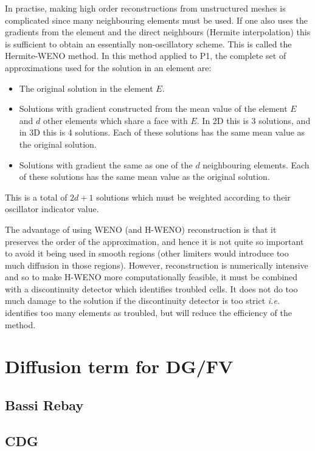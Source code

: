 In practise, making high order reconstructions from unstructured
meshes is complicated since many neighbouring elements must be
used. If one also uses the gradients from the element and the direct
neighbours (Hermite interpolation) this is sufficient to obtain an
essentially non-oscillatory scheme. This is called the Hermite-WENO
method. In this method applied to P1, the complete set of
approximations used for the solution in an element are:
\begin{itemize}
\item The original solution in the element $E$.
\item Solutions with gradient constructed from the mean value of the
  element $E$ and $d$ other elements which share a face with $E$.  In
  2D this is 3 solutions, and in 3D this is 4 solutions. Each of these
  solutions has the same mean value as the original solution.
\item Solutions with gradient the same as one of the $d$ neighbouring
  elements. Each of these solutions has the same mean value as the
  original solution.
\end{itemize}
This is a total of $2d+1$ solutions which must be weighted according
to their oscillator indicator value.

The advantage of using WENO (and H-WENO) reconstruction is that it
preserves the order of the approximation, and hence it is not quite so
important to avoid it being used in smooth regions (other limiters
would introduce too much diffusion in those regions). However,
reconstruction is numerically intensive and so to make H-WENO more
computationally feasible, it must be combined with a discontinuity
detector which identifies troubled cells. It does not do too much
damage to the solution if the discontinuity detector is too strict
\emph{i.e.}  identifies too many elements as troubled, but will reduce
the efficiency of the method. 

\section{Diffusion term for DG/FV}\label{sec:NM_DG_diffusion}
\subsection{Bassi Rebay}
\subsection{CDG}

